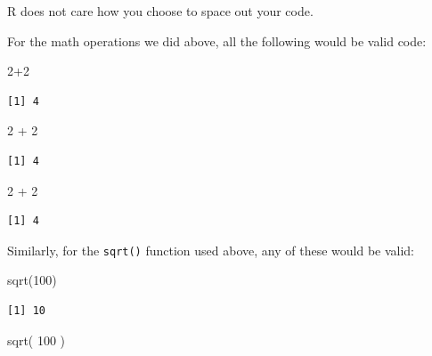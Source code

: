 \documentclass[
  letterpaper,
  DIV=11,
  numbers=noendperiod]{scrreprt}
\newenvironment{Shaded}{\begin{snugshade}}{\end{snugshade}}
\newcommand{\DecValTok}[1]{\textcolor[rgb]{0.68,0.00,0.00}{#1}}
\newcommand{\FunctionTok}[1]{\textcolor[rgb]{0.28,0.35,0.67}{#1}}
\newcommand{\NormalTok}[1]{\textcolor[rgb]{0.00,0.23,0.31}{#1}}
\newcommand{\SpecialCharTok}[1]{\textcolor[rgb]{0.37,0.37,0.37}{#1}}
\begin{document}
R does not care how you choose to space out your code.

For the math operations we did above, all the following would be valid
code:

\begin{Shaded}
\begin{Highlighting}[]
\DecValTok{2}\SpecialCharTok{+}\DecValTok{2}
\end{Highlighting}
\end{Shaded}

\begin{verbatim}
[1] 4
\end{verbatim}

\begin{Shaded}
\begin{Highlighting}[]
\DecValTok{2} \SpecialCharTok{+} \DecValTok{2}
\end{Highlighting}
\end{Shaded}

\begin{verbatim}
[1] 4
\end{verbatim}

\begin{Shaded}
\begin{Highlighting}[]
\DecValTok{2}                \SpecialCharTok{+}                   \DecValTok{2}
\end{Highlighting}
\end{Shaded}

\begin{verbatim}
[1] 4
\end{verbatim}

Similarly, for the \texttt{sqrt()} function used above, any of these
would be valid:

\begin{Shaded}
\begin{Highlighting}[]
\FunctionTok{sqrt}\NormalTok{(}\DecValTok{100}\NormalTok{)}
\end{Highlighting}
\end{Shaded}

\begin{verbatim}
[1] 10
\end{verbatim}

\begin{Shaded}
\begin{Highlighting}[]
\FunctionTok{sqrt}\NormalTok{(    }\DecValTok{100}\NormalTok{     )}
\end{Highlighting}
\end{Shaded}
\end{document}
